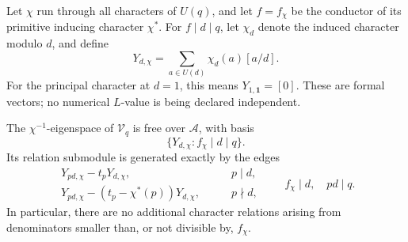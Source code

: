 Let \(\chi\) run through all characters of \(U(q)\), and let \(f=f_\chi\)
be the conductor of its primitive inducing character \(\chi^*\).
For \(f\mid d\mid q\), let \(\chi_d\) denote the induced character
modulo \(d\), and define
\begin{equation}
 Y_{d,\chi}=\sum_{a\in U(d)}\chi_d(a)[a/d].
 \label{eq:dist-character-vector}
\end{equation}
For the principal character at \(d=1\), this means
\(Y_{1,\mathbf1}=[0]\). These are formal vectors; no numerical
\(L\)-value is being declared independent.

\begin{lemma}
\label{lem:dist-all-components}
The \(\chi^{-1}\)-eigenspace of \(\mathcal V_q\) is free over
\(\mathcal A\), with basis
\[
 \{Y_{d,\chi}: f_\chi\mid d\mid q\}.
\]
Its relation submodule is generated exactly by the edges
\begin{equation}
 \begin{aligned}
 Y_{pd,\chi}-t_pY_{d,\chi},
     &\qquad p\mid d,\\
 Y_{pd,\chi}-(t_p-\chi^*(p))Y_{d,\chi},
     &\qquad p\nmid d,
 \end{aligned}
 \qquad f_\chi\mid d,\quad pd\mid q.
 \label{eq:dist-character-edges}
\end{equation}
In particular, there are no additional character relations arising
from denominators smaller than, or not divisible by, \(f_\chi\).
\end{lemma}

